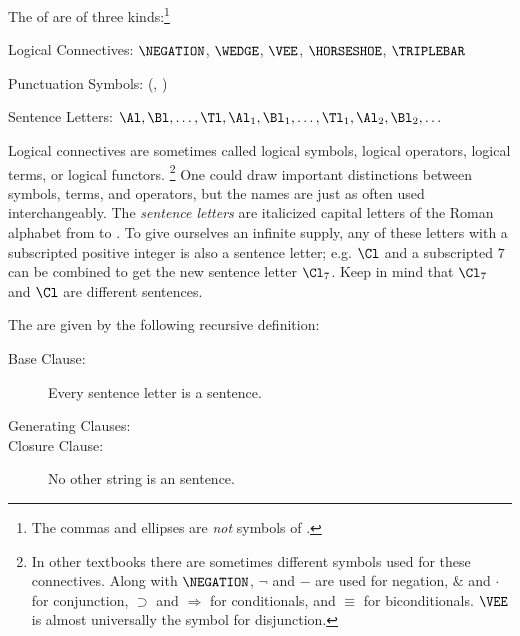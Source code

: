 \begin{majorILnc}{} The  of \GSL{} are of three kinds:\footnote{The commas and ellipses are \emph{not} symbols of \GSL{}.}
\begin{cenumerate}
\item Logical Connectives: $\NEGATION$, $\WEDGE$, $\VEE$, $\HORSESHOE$, $\TRIPLEBAR$
\item Punctuation Symbols: (, )
\item Sentence Letters: $\Al,\Bl, \ldots, \Tl, \Al_1,\Bl_1, \ldots, \Tl_1, \Al_2, \Bl_2, \ldots$  
\end{cenumerate}
\end{majorILnc} 
\noindent{}Logical connectives are sometimes called logical symbols, logical operators, logical terms, or logical functors.%
\footnote{%
In other textbooks there are sometimes different symbols used for these connectives. 
Along with $\NEGATION$, $\neg$ and $-$ are used for negation, $\&$ and $\cdot$ for conjunction, $\supset$ and $\Rightarrow$ for conditionals, and $\equiv$ for biconditionals. $\VEE$ is almost universally the symbol for disjunction.
} 
One could draw important distinctions between symbols, terms, and operators, but the names are just as often used interchangeably.
The \emph{sentence letters} are italicized capital letters of the Roman alphabet from \mention{$\Al$} to \mention{$\Tl$}.  To give ourselves an infinite supply, any of these letters with a subscripted positive integer is also a sentence letter; e.g. $\Cl$ and a subscripted $7$ can be combined to get the new sentence letter $\Cl_7$. Keep in mind that $\Cl_7$ and $\Cl$ are different sentences.

\begin{majorILnc}{} The   are given by the following recursive definition:
\begin{description}
\item[Base Clause:] Every sentence letter is a sentence.
\item[Generating Clauses:] \hfill
{}
\item[Closure Clause:] No other string is an \GSL{} sentence.
\end{description}
\end{majorILnc}

